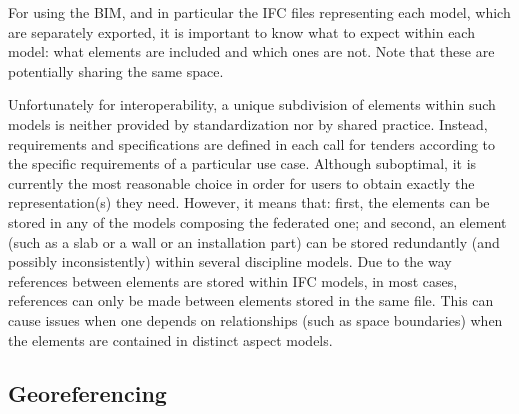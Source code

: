 For using the BIM, and in particular the IFC files representing each model, which are separately exported, it is important to know what to expect within each model: what elements are included and which ones are not.
Note that these are potentially sharing the same space.
%

Unfortunately for interoperability, a unique subdivision of elements within such models is neither provided by standardization nor by shared practice.
Instead, requirements and specifications are defined in each call for tenders according to the specific requirements of a particular use case.
Although suboptimal, it is currently the most reasonable choice in order for users to obtain exactly the representation(s) they need.
However, it means that: first, the elements can be stored in any of the models composing the federated one; and second, an element (such as a slab or a wall or an installation part) can be stored redundantly (and possibly inconsistently) within several discipline models.
Due to the way references between elements are stored within IFC models, in most cases, references can only be made between elements stored in the same file. This can cause issues when one depends on relationships (such as space boundaries) when the elements are contained in distinct aspect models.
%


\subsection{Georeferencing}

